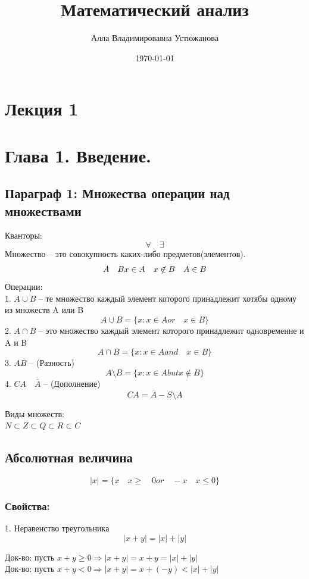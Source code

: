 \documentclass[a4paper, 12pt]{article}
\title{Математический анализ}
\author{Алла Владимировавна Устюжанова}
\date{\today}
\begin{document}
\maketitle
\section*{Лекция 1}

\section{Глава 1. Введение. }
\subsection{Параграф 1: Множества операции над множествами}
Кванторы:
\[
	\forall \quad \exists
\]
Множество -- это совокупность каких-либо предметов(элементов).
\[
	A \quad B  \\
	x \in A\\ \quad
	x \not\in B	\\\quad
	A \in B\\
\]
Операции: \\
1. $ A \cup B $ -- те множество каждый элемент которого принадлежит хотябы одному из множеств A или B \[
	A \cup B = \{x:x \in A or \quad x \in B\}	
\]
2. $ A \cap B $ -- это множество каждый элемент которого принадлежит одновременне и A и B \[
	 A \cap B = \{x: x\in A and \quad x \in B\}	
\]
3. $ A B $ -- (Разность)\[
	A \setminus B = \{x: x\in A but x\not\in B\}	
\]
4. $ CA \quad\bar{A} $ -- (Дополнение) \[
	CA = \bar{A} - S\setminus A	
\]


Виды множеств:\\
$ N \subset Z \subset Q \subset R \subset C $\\

\subsection{Абсолютная величина}
\[
	|x| = \{x \quad x \geq \quad0 or \quad -x \quad x\leq 0\}	
\]
\subsubsection*{Свойства:}
1. Неравенство треугольника \[
 |x+y| = |x| + |y|	
\]
\begin{mdframed}[backgroundcolor=blue!20] 
       Док-во: пусть $  x+y \geq 0\Rightarrow |x+y| = x+y=|x|+|y|$\\
       Док-во: пусть $  x+y < 0\Rightarrow |x+y| = x+(-y)<|x|+|y|$
    \end{mdframed}
\end{document}
